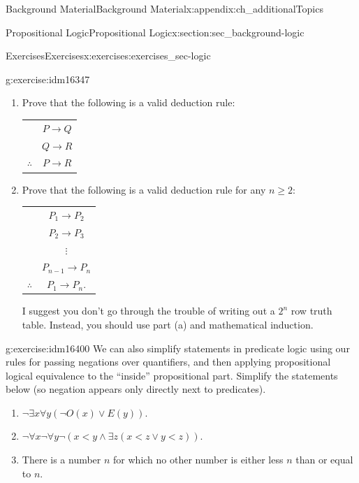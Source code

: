\documentclass[oneside,10pt,]{book}
\numberwithin{equation}{chapter}
\newcommand{\hrulethin}  {\noalign{\hrule height 0.04em}}
\def\imp{\rightarrow}
\newcommand{\lt}{<}
\begin{document}
\begin{appendixptx}{Background Material}{}{Background Material}{}{}{x:appendix:ch_additionalTopics}
\begin{sectionptx}{Propositional Logic}{}{Propositional Logic}{}{}{x:section:sec_background-logic}
\begin{exercises-subsection}{Exercises}{}{Exercises}{}{}{x:exercises:exercises_sec-logic}
\begin{divisionexercise}{13}{}{}{g:exercise:idm16347}
%
\begin{enumerate}[label=(\alph*)]
\item{}Prove that the following is a valid deduction rule:%
\begin{sidebyside}{1}{0}{0}{0}%
\begin{sbspanel}{1}%
{\centering%
\begin{tabular}{cc}
&\(P \imp Q\)\tabularnewline[0pt]
&\(Q \imp R\)\tabularnewline\hrulethin
\(\therefore\)&\(P \imp R\)
\end{tabular}
\par}
\end{sbspanel}%
\end{sidebyside}%
\item{}Prove that the following is a valid deduction rule for any \(n \ge 2\):%
\begin{sidebyside}{1}{0}{0}{0}%
\begin{sbspanel}{1}%
{\centering%
\begin{tabular}{cc}
&\(P_1 \imp P_2\)\tabularnewline[0pt]
&\(P_2 \imp P_3\)\tabularnewline[0pt]
&\(\vdots\)\tabularnewline[0pt]
&\(P_{n-1} \imp P_n\)\tabularnewline\hrulethin
\(\therefore\)&\(P_1 \imp P_n\).
\end{tabular}
\par}
\end{sbspanel}%
\end{sidebyside}%
\par
I suggest you don't go through the trouble of writing out a \(2^n\) row truth table. Instead, you should use part (a) and mathematical induction. %
\end{enumerate}
%
\end{divisionexercise}%
\begin{divisionexercise}{14}{}{}{g:exercise:idm16400}%
We can also simplify statements in predicate logic using our rules for passing negations over quantifiers, and then applying propositional logical equivalence to the ``inside'' propositional part.  Simplify the statements below (so negation appears only directly next to predicates).%
\par
%
\begin{enumerate}[label=(\alph*)]
\item{}\(\neg \exists x \forall y (\neg O(x) \vee E(y))\).%
\item{}\(\neg \forall x \neg \forall y \neg(x \lt  y \wedge \exists z (x \lt  z \vee y \lt  z))\).%
\item{}There is a number \(n\) for which no other number is either less \(n\) than or equal to \(n\).%

\end{enumerate}
\end{divisionexercise}
\end{exercises-subsection}
\end{sectionptx}
\end{appendixptx}
\end{document}
